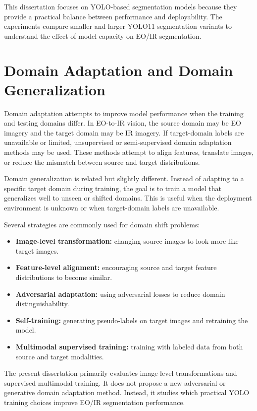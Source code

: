 This dissertation focuses on YOLO-based segmentation models because they provide a practical balance between performance and deployability. The experiments compare smaller and larger YOLO11 segmentation variants to understand the effect of model capacity on EO/IR segmentation.

\section{Domain Adaptation and Domain Generalization}

Domain adaptation attempts to improve model performance when the training and testing domains differ. In EO-to-IR vision, the source domain may be EO imagery and the target domain may be IR imagery. If target-domain labels are unavailable or limited, unsupervised or semi-supervised domain adaptation methods may be used. These methods attempt to align features, translate images, or reduce the mismatch between source and target distributions.

Domain generalization is related but slightly different. Instead of adapting to a specific target domain during training, the goal is to train a model that generalizes well to unseen or shifted domains. This is useful when the deployment environment is unknown or when target-domain labels are unavailable.

Several strategies are commonly used for domain shift problems:

\begin{itemize}
    \item \textbf{Image-level transformation:} changing source images to look more like target images.
    \item \textbf{Feature-level alignment:} encouraging source and target feature distributions to become similar.
    \item \textbf{Adversarial adaptation:} using adversarial losses to reduce domain distinguishability.
    \item \textbf{Self-training:} generating pseudo-labels on target images and retraining the model.
    \item \textbf{Multimodal supervised training:} training with labeled data from both source and target modalities.
\end{itemize}

The present dissertation primarily evaluates image-level transformations and supervised multimodal training. It does not propose a new adversarial or generative domain adaptation method. Instead, it studies which practical YOLO training choices improve EO/IR segmentation performance.

